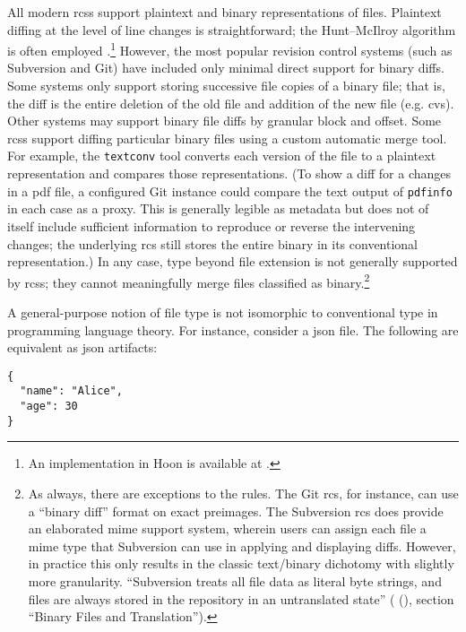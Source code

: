 \documentclass[twoside]{article}
\begin{document}
All modern {\sc rcs}s support plaintext and binary representations of files.  Plaintext diffing at the level of line changes is straightforward; the Hunt–McIlroy algorithm is often employed \citep{Hunt1976}.\footnote{An implementation in Hoon is available at .}  However, the most popular revision control systems (such as Subversion and Git) have included only minimal direct support for binary diffs.  Some systems only support storing successive file copies of a binary file; that is, the diff is the entire deletion of the old file and addition of the new file (e.g. {\sc cvs}).  Other systems may support binary file diffs by granular block and offset.  Some {\sc rcs}s support diffing particular binary files using a custom automatic merge tool.  For example, the \texttt{textconv} tool converts each version of the file to a plaintext representation and compares those representations.  (To show a diff for a changes in a {\sc pdf} file, a configured Git instance could compare the text output of \texttt{pdfinfo} in each case as a proxy.  This is generally legible as metadata but does not of itself include sufficient information to reproduce or reverse the intervening changes; the underlying {\sc rcs} still stores the entire binary in its conventional representation.)  In any case, type beyond file extension is not generally supported by {\sc rcs}s; they cannot meaningfully merge files classified as binary.\footnote{As always, there are exceptions to the rules.  The Git {\sc rcs}, for instance, can use a “binary diff” format on exact preimages.  The Subversion {\sc rcs} does provide an elaborated {\sc mime} support system, wherein users can assign each file a {\sc mime} type that Subversion can use in applying and displaying diffs.  However, in practice this only results in the classic text/binary dichotomy with slightly more granularity.  ``Subversion treats all file data as literal byte strings, and files are always stored in the repository in an untranslated state'' (\citeauthor{Collins2016} (\citeyear{Collins2016}), section ``Binary Files and Translation'').}

A general-purpose notion of file type is not isomorphic to conventional type in programming language theory.  For instance, consider a {\sc json} file.  The following are equivalent as {\sc json} artifacts:

\begin{lstlisting}[style=listingcode]
{
  "name": "Alice",
  "age": 30
}
\end{lstlisting}
\end{document}
